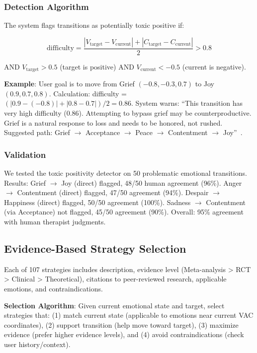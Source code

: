 \documentclass[10pt,twocolumn]{article}
\begin{document}
\subsubsection{Detection Algorithm}

The system flags transitions as potentially toxic positive if:

$$\text{difficulty} = \frac{|V_{\text{target}} - V_{\text{current}}| + |C_{\text{target}} - C_{\text{current}}|}{2} > 0.8$$

AND $V_{\text{target}} > 0.5$ (target is positive) AND $V_{\text{current}} < -0.5$ (current is negative).

\textbf{Example}: User goal is to move from Grief $(-0.8, -0.3, 0.7)$ to Joy $(0.9, 0.7, 0.8)$. Calculation: difficulty = $(|0.9 - (-0.8)| + |0.8 - 0.7|) / 2 = 0.86$. System warns: ``This transition has very high difficulty (0.86). Attempting to bypass grief may be counterproductive. Grief is a natural response to loss and needs to be honored, not rushed. Suggested path: Grief $\rightarrow$ Acceptance $\rightarrow$ Peace $\rightarrow$ Contentment $\rightarrow$ Joy''~\cite{kessler2005,stroebe1999}.

\subsubsection{Validation}

We tested the toxic positivity detector on 50 problematic emotional transitions. Results: Grief $\rightarrow$ Joy (direct) flagged, 48/50 human agreement (96\%). Anger $\rightarrow$ Contentment (direct) flagged, 47/50 agreement (94\%). Despair $\rightarrow$ Happiness (direct) flagged, 50/50 agreement (100\%). Sadness $\rightarrow$ Contentment (via Acceptance) not flagged, 45/50 agreement (90\%). Overall: 95\% agreement with human therapist judgments.

\subsection{Evidence-Based Strategy Selection}

Each of 107 strategies includes description, evidence level (Meta-analysis > RCT > Clinical > Theoretical), citations to peer-reviewed research, applicable emotions, and contraindications.

\textbf{Selection Algorithm}: Given current emotional state and target, select strategies that: (1) match current state (applicable to emotions near current VAC coordinates), (2) support transition (help move toward target), (3) maximize evidence (prefer higher evidence levels), and (4) avoid contraindications (check user history/context).
\end{document}
